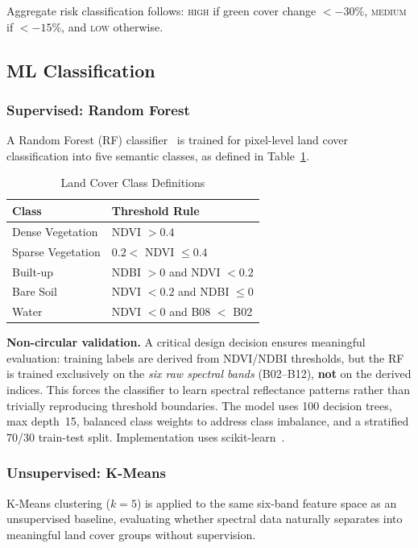 \documentclass[conference,10pt]{IEEEtran}
\begin{document}
Aggregate risk classification follows: \textsc{high} if green cover change $<-30\%$, \textsc{medium} if $<-15\%$, and \textsc{low} otherwise.

\subsection{ML Classification}

\subsubsection{Supervised: Random Forest}
A Random Forest (RF) classifier~\cite{breiman2001} is trained for pixel-level land cover classification into five semantic classes, as defined in Table~\ref{tab:classes}.

\begin{table}[h]
\centering
\caption{Land Cover Class Definitions}
\label{tab:classes}
\begin{tabular}{ll}
\toprule
\textbf{Class} & \textbf{Threshold Rule} \\
\midrule
Dense Vegetation & NDVI $> 0.4$ \\
Sparse Vegetation & $0.2 <$ NDVI $\leq 0.4$ \\
Built-up & NDBI $> 0$ and NDVI $< 0.2$ \\
Bare Soil & NDVI $< 0.2$ and NDBI $\leq 0$ \\
Water & NDVI $< 0$ and B08 $<$ B02 \\
\bottomrule
\end{tabular}
\end{table}

\textbf{Non-circular validation.} A critical design decision ensures meaningful evaluation: training labels are derived from NDVI/NDBI thresholds, but the RF is trained exclusively on the \textit{six raw spectral bands} (B02--B12), \textbf{not} on the derived indices. This forces the classifier to learn spectral reflectance patterns rather than trivially reproducing threshold boundaries. The model uses 100 decision trees, max depth~15, balanced class weights to address class imbalance, and a stratified 70/30 train-test split. Implementation uses scikit-learn~\cite{pedregosa2011}.

\subsubsection{Unsupervised: K-Means}
K-Means clustering ($k{=}5$) is applied to the same six-band feature space as an unsupervised baseline, evaluating whether spectral data naturally separates into meaningful land cover groups without supervision.
\end{document}
